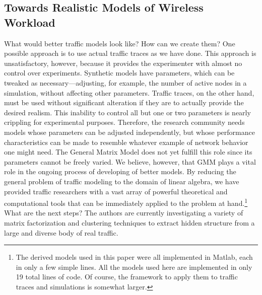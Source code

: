 \documentclass[twocolumn,final]{svjour3}
\newcommand{\caps}[1]{{\small{#1}}}
\begin{document}

\subsection{Towards Realistic Models of Wireless Workload}

What would better traffic models look like? How can we create them? One possible approach is to use actual traffic traces as we have done. This approach is unsatisfactory, however, because it provides the experimenter with almost no control over experiments. Synthetic models have parameters, which can be tweaked as necessary---adjusting, for example, the number of active nodes in a simulation, without affecting other parameters. Traffic traces, on the other hand, must be used without significant alteration if they are to actually provide the desired realism. This inability to control all but one or two parameters is nearly crippling for experimental purposes. Therefore, the research community needs models whose parameters can be adjusted independently, but whose performance characteristics can be made to resemble whatever example of network behavior one might need. The General Matrix Model does not yet fulfill this role since its parameters cannot be freely varied. We believe, however, that \caps{GMM} plays a vital role in the ongoing process of developing  of better models. By reducing the general problem of traffic modeling to the domain of linear algebra, we have provided traffic researchers with a vast array of powerful theoretical and computational tools that can be immediately applied to the problem at hand.\footnote{The derived models used in this paper were all implemented in Matlab, each in only a few simple lines. All the models used here are implemented in only 19 total lines of code. Of course, the framework to apply them to traffic traces and simulations is somewhat larger.} What are the next steps? The authors are currently investigating a variety of matrix factorization and clustering techniques to extract hidden structure from a large and diverse body of real traffic.
\end{document}
